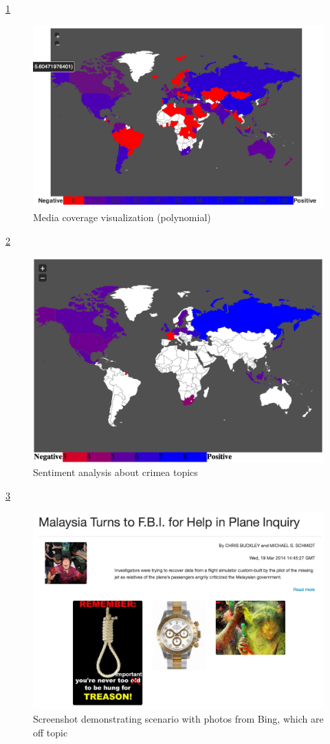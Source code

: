 \documentclass{acm_proc_10ptArticle-sp}
\begin{document}
\ref{screenshot:coverage}
\begin{figure}[H]
  \centering
  \includegraphics[width=0.9\linewidth]{img/media-coverage-polynomial.png}
  \caption{Media coverage visualization (polynomial)}
  \label{screenshot:coverage}
\end{figure}

\ref{screenshot:crimea}
\begin{figure}[H]
  \centering
  \includegraphics[width=0.9\linewidth]{img/crimea.png}
  \caption{Sentiment analysis about crimea topics}
  \label{screenshot:crimea}
\end{figure}

\ref{screenshot:limitation}
\begin{figure}[H]
  \centering
  \includegraphics[width=0.9\linewidth]{img/limitation-ZK.png}
  \caption{Screenshot demonstrating scenario with photos from Bing, which are off topic}
  \label{screenshot:limitation}
\end{figure}
\end{document}
